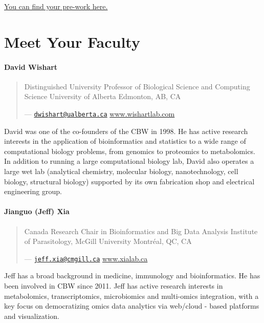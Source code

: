 \documentclass[
]{book}
\begin{document}
\href{https://docs.google.com/forms/d/e/1FAIpQLSezV8cbusyLYa98AJ50sZfOlW1HsKZmDh7XnsDKusRg73zkbw/viewform}{You can find your pre-work here.}

\chapter{Meet Your Faculty}\label{meet-your-faculty}

\subsubsection{David Wishart}\label{david-wishart}

\begin{quote}
Distinguished University Professor of Biological Science and Computing Science
University of Alberta
Edmonton, AB, CA

--- \href{mailto:dwishart@ualberta.ca}{\nolinkurl{dwishart@ualberta.ca}}
\url{www.wishartlab.com}
\end{quote}

David was one of the co-founders of the CBW in 1998. He has active research interests in the
application of bioinformatics and statistics to a wide range of computational biology problems,
from genomics to proteomics to metabolomics. In addition to running a large computational
biology lab, David also operates a large wet lab (analytical chemistry, molecular biology,
nanotechnology, cell biology, structural biology) supported by its own fabrication shop and
electrical engineering group.

\subsubsection{Jianguo (Jeff) Xia}\label{jianguo-jeff-xia}

\begin{quote}
Canada Research Chair in Bioinformatics and Big Data Analysis
Institute of Parasitology, McGill University
Montréal, QC, CA

--- \href{mailto:jeff.xia@cmgill.ca}{\nolinkurl{jeff.xia@cmgill.ca}}
\url{www.xialab.ca}
\end{quote}

Jeff has a broad background in medicine, immunology and bioinformatics. He has been involved
in CBW since 2011. Jeff has active research interests in metabolomics, transcriptomics,
microbiomics and multi-omics integration, with a key focus on democratizing omics data
analytics via web/cloud - based platforms and visualization.
\end{document}

